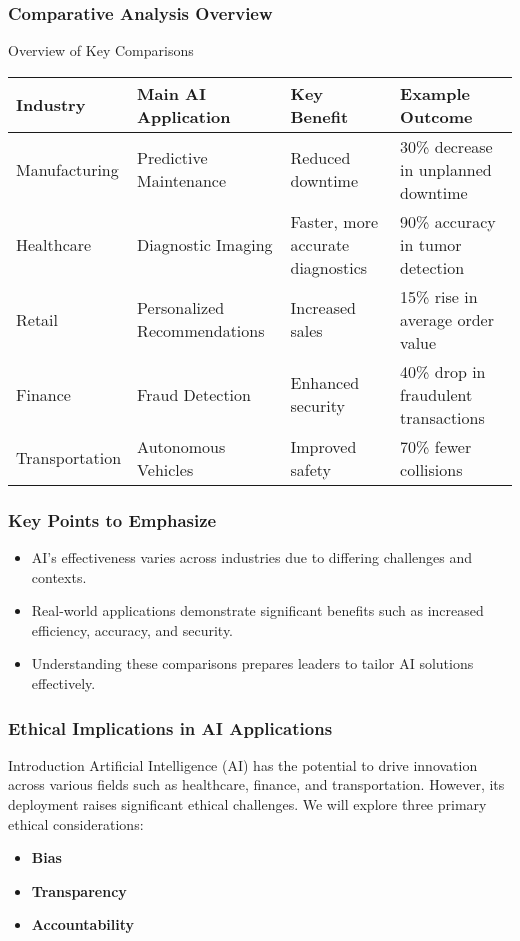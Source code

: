 \documentclass{beamer}
\begin{document}
\begin{frame}[fragile]
    \frametitle{Comparative Analysis Overview}
    \begin{block}{Overview of Key Comparisons}
        \begin{tabular}{|l|l|l|l|}
            \hline
            \textbf{Industry} & \textbf{Main AI Application} & \textbf{Key Benefit} & \textbf{Example Outcome} \\
            \hline
            Manufacturing & Predictive Maintenance & Reduced downtime & 30\% decrease in unplanned downtime \\
            \hline
            Healthcare & Diagnostic Imaging & Faster, more accurate diagnostics & 90\% accuracy in tumor detection \\
            \hline
            Retail & Personalized Recommendations & Increased sales & 15\% rise in average order value \\
            \hline
            Finance & Fraud Detection & Enhanced security & 40\% drop in fraudulent transactions \\
            \hline
            Transportation & Autonomous Vehicles & Improved safety & 70\% fewer collisions \\
            \hline
        \end{tabular}
    \end{block}
\end{frame}

\begin{frame}[fragile]
    \frametitle{Key Points to Emphasize}
    \begin{itemize}
        \item AI's effectiveness varies across industries due to differing challenges and contexts.
        \item Real-world applications demonstrate significant benefits such as increased efficiency, accuracy, and security.
        \item Understanding these comparisons prepares leaders to tailor AI solutions effectively.
    \end{itemize}
\end{frame}

\begin{frame}[fragile]
    \frametitle{Ethical Implications in AI Applications}
    \begin{block}{Introduction}
        Artificial Intelligence (AI) has the potential to drive innovation across various fields such as healthcare, finance, and transportation. 
        However, its deployment raises significant ethical challenges. We will explore three primary ethical considerations:
        \begin{itemize}
            \item \textbf{Bias}
            \item \textbf{Transparency}
            \item \textbf{Accountability}
        \end{itemize}
    \end{block}
\end{frame}
\end{document}
